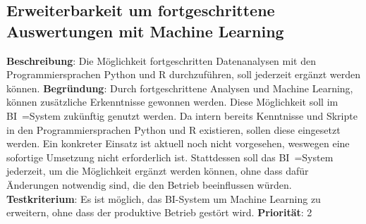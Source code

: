 \subsection[Erweiterbarkeit um Machine Learning]{Erweiterbarkeit um fortgeschrittene Auswertungen mit Machine Learning} \label{sec:anforderungsspezifikation:datenanalysePythonUndR}
\textbf{Beschreibung}: Die Möglichkeit fortgeschritten Datenanalysen mit den Programmiersprachen Python und R durchzuführen, soll jederzeit ergänzt werden können. 
\newline \textbf{Begründung}: Durch fortgeschrittene Analysen und Machine Learning, können zusätzliche Erkenntnisse gewonnen werden. Diese Möglichkeit soll im BI~=System zukünftig genutzt werden. Da intern bereits Kenntnisse und Skripte in den Programmiersprachen Python und R existieren, sollen diese eingesetzt werden. Ein konkreter Einsatz ist aktuell noch nicht vorgesehen, weswegen eine sofortige Umsetzung nicht erforderlich ist. Stattdessen soll das BI~=System jederzeit, um die Möglichkeit ergänzt werden können, ohne dass dafür Änderungen notwendig sind, die den Betrieb beeinflussen würden. 
\newline \textbf{Testkriterium}: Es ist möglich, das BI-System um Machine Learning zu erweitern, ohne dass der produktive Betrieb gestört wird.
\newline \textbf{Priorität}: 2